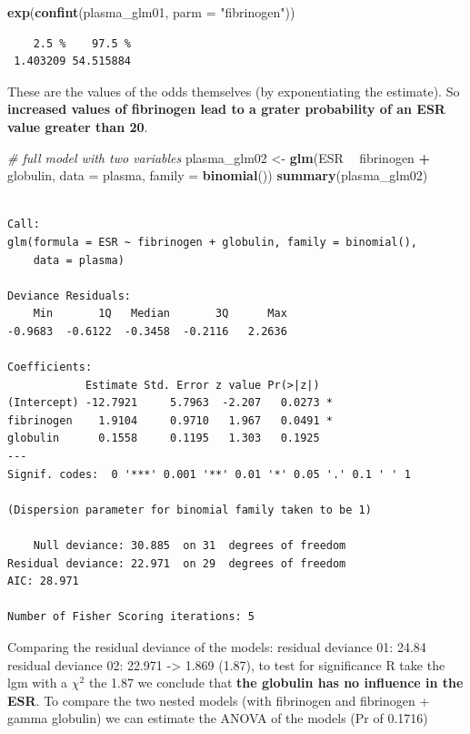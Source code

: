 \documentclass[
]{article}
\newenvironment{Shaded}{\begin{snugshade}}{\end{snugshade}}
\newcommand{\CommentTok}[1]{\textcolor[rgb]{0.56,0.35,0.01}{\textit{#1}}}
\newcommand{\DataTypeTok}[1]{\textcolor[rgb]{0.13,0.29,0.53}{#1}}
\newcommand{\KeywordTok}[1]{\textcolor[rgb]{0.13,0.29,0.53}{\textbf{#1}}}
\newcommand{\NormalTok}[1]{#1}
\newcommand{\OperatorTok}[1]{\textcolor[rgb]{0.81,0.36,0.00}{\textbf{#1}}}
\newcommand{\StringTok}[1]{\textcolor[rgb]{0.31,0.60,0.02}{#1}}
\begin{document}
\begin{Shaded}
\begin{Highlighting}[]
\KeywordTok{exp}\NormalTok{(}\KeywordTok{confint}\NormalTok{(plasma_glm01, }\DataTypeTok{parm =} \StringTok{"fibrinogen"}\NormalTok{))}
\end{Highlighting}
\end{Shaded}

\begin{verbatim}
    2.5 %    97.5 % 
 1.403209 54.515884 
\end{verbatim}

These are the values of the odds themselves (by exponentiating the
estimate). So \textbf{increased values of fibrinogen lead to a grater
probability of an ESR value greater than 20}.

\begin{Shaded}
\begin{Highlighting}[]
\CommentTok{# full model with two variables}
\NormalTok{plasma_glm02 <-}\StringTok{ }\KeywordTok{glm}\NormalTok{(ESR }\OperatorTok{~}\StringTok{ }\NormalTok{fibrinogen }\OperatorTok{+}\StringTok{ }\NormalTok{globulin, }\DataTypeTok{data =}\NormalTok{ plasma, }\DataTypeTok{family =} \KeywordTok{binomial}\NormalTok{())}
\KeywordTok{summary}\NormalTok{(plasma_glm02)}
\end{Highlighting}
\end{Shaded}

\begin{verbatim}

Call:
glm(formula = ESR ~ fibrinogen + globulin, family = binomial(), 
    data = plasma)

Deviance Residuals: 
    Min       1Q   Median       3Q      Max  
-0.9683  -0.6122  -0.3458  -0.2116   2.2636  

Coefficients:
            Estimate Std. Error z value Pr(>|z|)  
(Intercept) -12.7921     5.7963  -2.207   0.0273 *
fibrinogen    1.9104     0.9710   1.967   0.0491 *
globulin      0.1558     0.1195   1.303   0.1925  
---
Signif. codes:  0 '***' 0.001 '**' 0.01 '*' 0.05 '.' 0.1 ' ' 1

(Dispersion parameter for binomial family taken to be 1)

    Null deviance: 30.885  on 31  degrees of freedom
Residual deviance: 22.971  on 29  degrees of freedom
AIC: 28.971

Number of Fisher Scoring iterations: 5
\end{verbatim}

Comparing the residual deviance of the models: residual deviance 01:
24.84 residual deviance 02: 22.971 -\textgreater{} 1.869 (1.87), to test
for significance R take the lgm with a \(\chi^2\) the 1.87 we conclude
that \textbf{the globulin has no influence in the ESR}. To compare the
two nested models (with fibrinogen and fibrinogen + gamma globulin) we
can estimate the ANOVA of the models (Pr of 0.1716)
\end{document}
